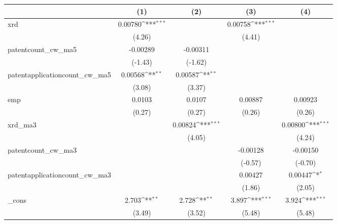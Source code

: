 {
\def\sym#1{\ifmmode^{#1}\else\(^{#1}\)\fi}
\begin{tabular}{l*{4}{c}}
\hline\hline
            &\multicolumn{1}{c}{(1)}         &\multicolumn{1}{c}{(2)}         &\multicolumn{1}{c}{(3)}         &\multicolumn{1}{c}{(4)}         \\
\hline
xrd         &     0.00780\sym{***}&                     &     0.00758\sym{***}&                     \\
            &      (4.26)         &                     &      (4.41)         &                     \\
[1em]
patentcount\_cw\_ma5&    -0.00289         &    -0.00311         &                     &                     \\
            &     (-1.43)         &     (-1.62)         &                     &                     \\
[1em]
patentapplicationcount\_cw\_ma5&     0.00568\sym{**} &     0.00587\sym{**} &                     &                     \\
            &      (3.08)         &      (3.37)         &                     &                     \\
[1em]
emp         &      0.0103         &      0.0107         &     0.00887         &     0.00923         \\
            &      (0.27)         &      (0.27)         &      (0.26)         &      (0.26)         \\
[1em]
xrd\_ma3     &                     &     0.00824\sym{***}&                     &     0.00800\sym{***}\\
            &                     &      (4.05)         &                     &      (4.24)         \\
[1em]
patentcount\_cw\_ma3&                     &                     &    -0.00128         &    -0.00150         \\
            &                     &                     &     (-0.57)         &     (-0.70)         \\
[1em]
patentapplicationcount\_cw\_ma3&                     &                     &     0.00427         &     0.00447\sym{*}  \\
            &                     &                     &      (1.86)         &      (2.05)         \\
[1em]
\_cons      &       2.703\sym{**} &       2.728\sym{**} &       3.897\sym{***}&       3.924\sym{***}\\
            &      (3.49)         &      (3.52)         &      (5.48)         &      (5.48)         \\

\end{tabular}}
